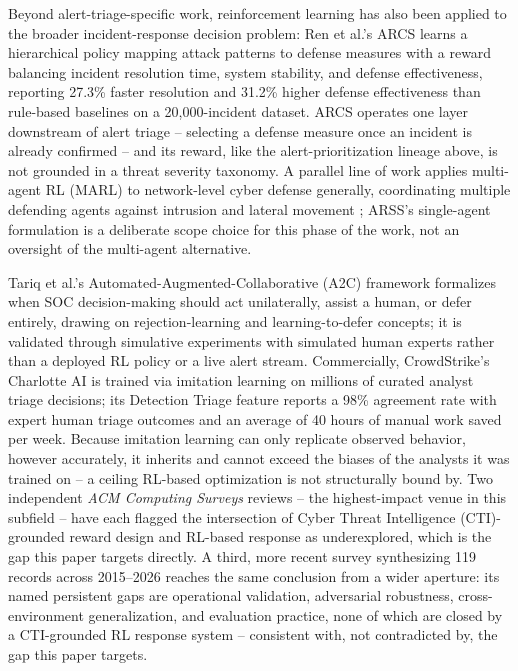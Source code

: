 \documentclass[conference]{IEEEtran}
\begin{document}
Beyond alert-triage-specific work, reinforcement learning has also been applied to the broader incident-response decision problem: Ren et al.'s ARCS \cite{arcs2025} learns a hierarchical policy mapping attack patterns to defense measures with a reward balancing incident resolution time, system stability, and defense effectiveness, reporting 27.3\% faster resolution and 31.2\% higher defense effectiveness than rule-based baselines on a 20,000-incident dataset. ARCS operates one layer downstream of alert triage -- selecting a defense measure once an incident is already confirmed -- and its reward, like the alert-prioritization lineage above, is not grounded in a threat severity taxonomy. A parallel line of work applies multi-agent RL (MARL) to network-level cyber defense generally, coordinating multiple defending agents against intrusion and lateral movement \cite{marl_cybersec2025}; ARSS's single-agent formulation is a deliberate scope choice for this phase of the work, not an oversight of the multi-agent alternative.

Tariq et al.'s Automated-Augmented-Collaborative (A2C) framework \cite{a2c2024} formalizes when SOC decision-making should act unilaterally, assist a human, or defer entirely, drawing on rejection-learning and learning-to-defer concepts; it is validated through simulative experiments with simulated human experts rather than a deployed RL policy or a live alert stream. Commercially, CrowdStrike's Charlotte AI \cite{charlotte2024} is trained via imitation learning on millions of curated analyst triage decisions; its Detection Triage feature reports a 98\% agreement rate with expert human triage outcomes and an average of 40 hours of manual work saved per week. Because imitation learning can only replicate observed behavior, however accurately, it inherits and cannot exceed the biases of the analysts it was trained on -- a ceiling RL-based optimization is not structurally bound by. Two independent \emph{ACM Computing Surveys} reviews \cite{tariq2025,jalalvand2024} -- the highest-impact venue in this subfield -- have each flagged the intersection of Cyber Threat Intelligence (CTI)-grounded reward design and RL-based response as underexplored, which is the gap this paper targets directly. A third, more recent survey \cite{alertfatigue_survey2026} synthesizing 119 records across 2015--2026 reaches the same conclusion from a wider aperture: its named persistent gaps are operational validation, adversarial robustness, cross-environment generalization, and evaluation practice, none of which are closed by a CTI-grounded RL response system -- consistent with, not contradicted by, the gap this paper targets.
\end{document}
